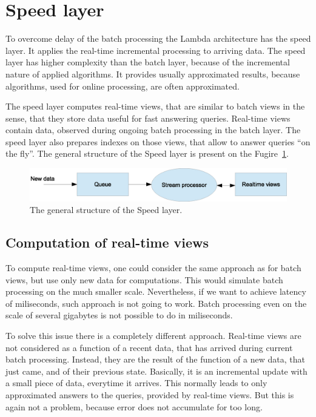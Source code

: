 \section{Speed layer}
\label{sec:speed_layer}

To overcome delay of the batch processing the Lambda architecture has the speed layer.
It applies the real-time incremental processing to arriving data.
The speed layer has higher complexity than the batch layer, because of the incremental nature of applied algorithms.
It provides usually approximated results, because algorithms, used for online processing, are often approximated.

The speed layer computes real-time views, that are similar to batch views in the sense, that they store data useful for fast answering queries.
Real-time views contain data, observed during ongoing batch processing in the batch layer.
The speed layer also prepares indexes on those views, that allow to answer queries ``on the fly''.
The general structure of the Speed layer is present on the Fugire~\ref{fig:SpeedLayer}.

\begin{figure}[h]
  \centering
  \includegraphics [width=1.0\textwidth]{images/SpeedLayer}
  \caption{The general structure of the Speed layer.}
  \label{fig:SpeedLayer}
\end{figure}

\subsection{Computation of real-time views}

To compute real-time views, one could consider the same approach as for batch views, but use only new data for computations.
This would simulate batch processing on the much smaller scale.
Nevertheless, if we want to achieve latency of miliseconds, such approach is not going to work.
Batch processing even on the scale of several gigabytes is not possible to do in miliseconds.

To solve this issue there is a completely different approach.
Real-time views are not considered as a function of a recent data, that has arrived during current batch processing.
Instead, they are the result of the function of a new data, that just came, and of their previous state.
Basically, it is an incremental update with a small piece of data, everytime it arrives.
This normally leads to only approximated answers to the queries, provided by real-time views.
But this is again not a problem, because error does not accumulate for too long.

